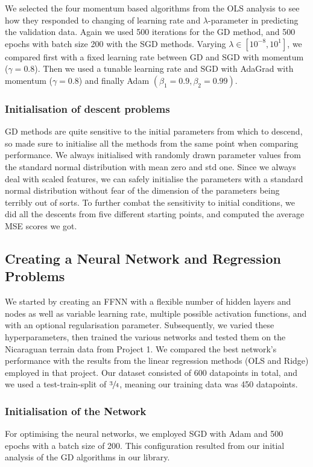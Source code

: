         We selected the four momentum based algorithms from the OLS analysis to see how they responded to changing of learning rate and $\lambda$-parameter in predicting the validation data. Again we used 500 iterations for the GD method, and 500 epochs with batch size 200 with the SGD methods. Varying $\lambda \in [10^{-8}, 10^1]$, we compared first with a fixed learning rate between GD and SGD with momentum ($\gamma=0.8$). Then we used a tunable learning rate and SGD with AdaGrad with momentum ($\gamma=0.8$) and finally Adam $(\beta_1=0.9, \beta_2=0.99)$.

    \subsubsection{Initialisation of descent problems}
        GD methods are quite sensitive to the initial parameters from which to descend, so made sure to initialise all the methods from the same point when comparing performance. We always initialised with randomly drawn parameter values from the standard normal distribution with mean zero and std one. Since we always deal with scaled features, we can safely initialise the parameters with a standard normal distribution without fear of the dimension of the parameters being terribly out of sorts. To further combat the sensitivity to initial conditions, we did all the descents from five different starting points, and computed the average MSE scores we got.

\subsection{Creating a Neural Network and Regression Problems}
    We started by creating an FFNN with a flexible number of hidden layers and nodes as well as variable learning rate, multiple possible activation functions, and with an optional regularisation parameter. Subsequently, we varied these hyperparameters, then trained the various networks and tested them on the Nicaraguan terrain data from Project 1. We compared the best network's performance with the results from the linear regression methods (OLS and Ridge) employed in that project. Our dataset consisted of 600 datapoints in total, and we used a test-train-split of $\sfrac{3}{4}$, meaning our training data was 450 datapoints. 
    
    \subsubsection{Initialisation of the Network}
         For optimising the neural networks, we employed SGD with Adam and 500 epochs with a batch size of 200. This configuration resulted from our initial analysis of the GD algorithms in our library.

